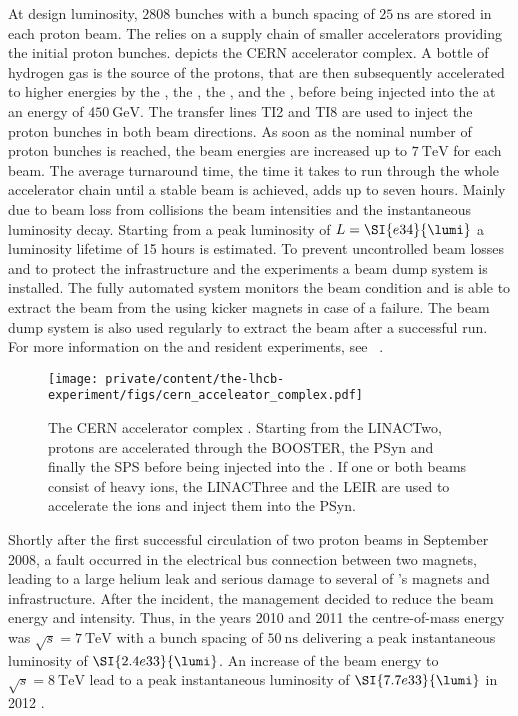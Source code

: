 At design luminosity, $\num{2808}$ bunches with a bunch spacing of
$\SI{25}{\nano\second}$ are stored in each proton beam. The \LHC relies on a
supply chain of smaller accelerators providing the initial proton bunches.
 depicts the \acs{CERN}
accelerator complex. A bottle of hydrogen gas is the source of the protons, that
are then subsequently accelerated to higher energies by the \LINACTwo, the
\BOOSTER, the \PSyn, and the \SPS, before being injected into the \LHC at an
energy of $\SI{450}{\GeV}$. The transfer lines TI2 and TI8 are used to inject
the proton bunches in both beam directions. As soon as the nominal number of
proton bunches is reached, the beam energies are increased up to $\SI{7}{\TeV}$
for each beam. The average \LHC turnaround time, \ie the time it takes to run
through the whole accelerator chain until a stable beam is achieved, adds up to
seven hours. Mainly due to beam loss from \pp collisions the beam intensities
and the instantaneous luminosity decay. Starting from a peak luminosity of
$L=\SI{e34}{\lumi}$ a luminosity lifetime of 15 hours is estimated. To prevent
uncontrolled beam losses and to protect the \LHC infrastructure and the \LHC
experiments a beam dump system is installed. The fully automated system monitors
the beam condition and is able to extract the beam from the \LHC using kicker
magnets in case of a failure. The beam dump system is also used regularly to
extract the beam after a successful run. For more information on the \LHC and
resident experiments, see \eg \Ref~\cite{Evans:2008zzb}.

\begin{figure}[t]
  \texttt{[image: private/content/the-lhcb-experiment/figs/cern\_acceleator\_complex.pdf]}
  \caption{
  The \acs{CERN} accelerator complex \cite{Christiane:1260465}. Starting from
  the \acs{LINACTwo}, protons are accelerated through the \acs{BOOSTER}, the
  \acs{PSyn} and finally the \acs{SPS} before being injected into the \LHC. If
  one or both beams consist of heavy ions, the \acs*{LINACThree} and the
  \acs*{LEIR} are used to accelerate the ions and inject them into the
  \acs{PSyn}. }
  \label{fig:lhcb_experiment:lhc:cern_accelerator_complex}
\end{figure}

Shortly after the first successful circulation of two proton beams in September
2008, a fault occurred in the electrical bus connection between two magnets,
leading to a large helium leak and serious damage to several of \LHC's magnets
and infrastructure. After the incident, the management decided to reduce the
beam energy and intensity. Thus, in the years 2010 and 2011 the \LHC
centre-of-mass energy was $\sqrt{s}=\SI{7}{\TeV}$ with a bunch spacing of
$\SI{50}{\nano\second}$ delivering a peak instantaneous luminosity of
$\SI{2.4e33}{\lumi}$. An increase of the beam energy to $\sqrt{s}=\SI{8}{\TeV}$
lead to a peak instantaneous luminosity of $\SI{7.7e33}{\lumi}$ in 2012
\cite{Lamont:2013cma}.

